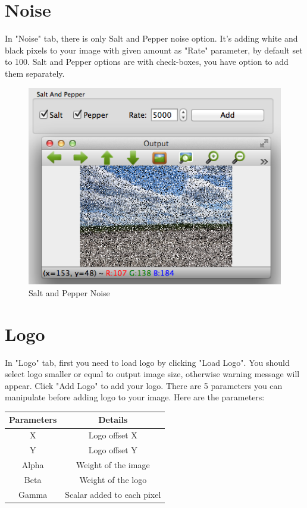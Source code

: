 \documentclass{article}
\begin{document}
\section{Noise}
In "Noise" tab, there is only Salt and Pepper noise option. It's adding white and black pixels to your image with given amount as "Rate" parameter, by default set to 100. Salt and Pepper options are with check-boxes, you have option to add them separately.

\begin{figure}[H]
\begin{center}
\includegraphics[scale=0.8]{toolboxNoise.png}
\caption{Salt and Pepper Noise}
\end{center}
\end{figure}	

\section{Logo}

In "Logo" tab, first you need to load logo by clicking "Load Logo". You should select logo smaller or equal to output image size, otherwise warning message will appear. Click "Add Logo" to add your logo. There are 5 parameters you can manipulate before adding logo to your image. Here are the parameters:


\begin{table}[H]
\begin{center}
\begin{tabular}{|c|c|l|l|l|}
\hline
\textbf{Parameters} & \multicolumn{4}{|c|}{\textbf{Details}}           \\ \hline
X                  & \multicolumn{4}{|c|}{Logo offset X}              \\ \hline
Y                  & \multicolumn{4}{|c|}{Logo offset Y}              \\ \hline
Alpha              & \multicolumn{4}{|c|}{Weight of the image}        \\ \hline
Beta               & \multicolumn{4}{|c|}{Weight of the logo}         \\ \hline
Gamma              & \multicolumn{4}{|c|}{Scalar added to each pixel} \\ \hline
\end{tabular}
\end{center}
\end{table}
\end{document}
